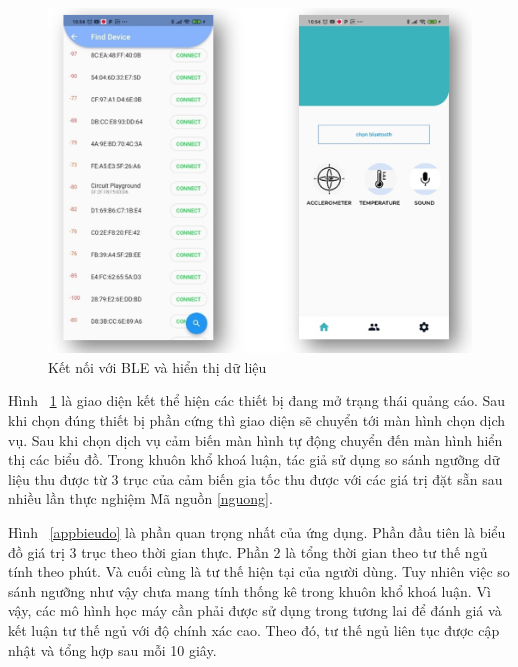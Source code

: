 \begin{figure}
    \centering
    \includegraphics[width=0.8\linewidth]{images/app_ble.png}
    \caption{Kết nối với BLE và hiển thị dữ liệu}
    \label{app_ble}
\end{figure}

Hình ~\ref{app_ble} là giao diện kết thể hiện các thiết bị đang mở trạng thái quảng cáo. Sau khi chọn đúng thiết bị phần cứng thì giao diện sẽ chuyển tới màn hình chọn dịch vụ. Sau khi chọn dịch vụ cảm biến màn hình tự động chuyển đến màn hình hiển thị các biểu đồ. Trong khuôn khổ khoá luận, tác giả sử dụng so sánh ngưỡng dữ liệu thu được từ 3 trục của cảm biến gia tốc thu được với các giá trị đặt sẵn sau nhiều lần thực nghiệm Mã nguồn \ref{nguong}.




Hình ~\ref{appbieudo} là phần quan trọng nhất của ứng dụng. Phần đầu tiên là biểu đồ giá trị 3 trục theo thời gian thực. Phần 2 là tổng thời gian theo tư thế ngủ tính theo phút. Và cuối cùng là tư thế hiện tại của người dùng.
Tuy nhiên việc so sánh ngưỡng như vậy chưa mang tính thống kê trong khuôn khổ khoá luận. Vì vậy, các mô hình học máy cần phải được sử dụng trong tương lai để đánh giá và kết luận tư thế ngủ với độ chính xác cao. Theo đó, tư thế ngủ liên tục được cập nhật và tổng hợp sau mỗi 10 giây.

